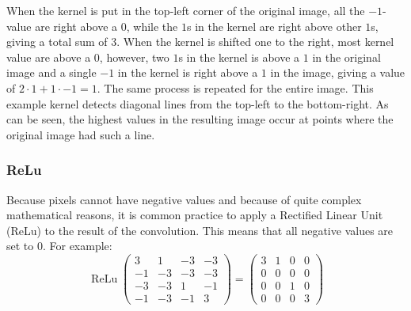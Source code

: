 \documentclass[12pt, titlepage]{article}
\begin{document}
		When the kernel is put in the top-left corner of the original image, all the $-1$-value are right above a $0$, while the $1$s in the kernel are right above other $1$s, giving a total sum of $3$. When the kernel is shifted one to the right, most kernel value are above a $0$, however, two $1$s in the kernel is above a $1$ in the original image and a single $-1$ in the kernel is right above a $1$ in the image, giving a value of $2\cdot 1+1\cdot -1=1$. The same process is repeated for the entire image. This example kernel detects diagonal lines from the top-left to the bottom-right. As can be seen, the highest values in the resulting image occur at points where the original image had such a line.
		
		\subsubsection{ReLu}\label{ReLu}
		Because pixels cannot have negative values and because of quite complex mathematical reasons, it is common practice to apply a Rectified Linear Unit (ReLu) to the result of the convolution. This means that all negative values are set to $0$. For example:
		\begin{equation*}
		\operatorname{ReLu}\begin{pmatrix}
		3 &1 &-3 &-3\\
		-1 & -3 & -3 &-3\\
		-3 &-3 &1 &-1\\
		-1 &-3 &-1 &3
		\end{pmatrix} = \begin{pmatrix}
		3 &1 &0 &0\\
		0 & 0 & 0 &0\\
		0 &0 &1 &0\\
		0 &0 &0 &3
		\end{pmatrix}
		\end{equation*}
		
\end{document}
